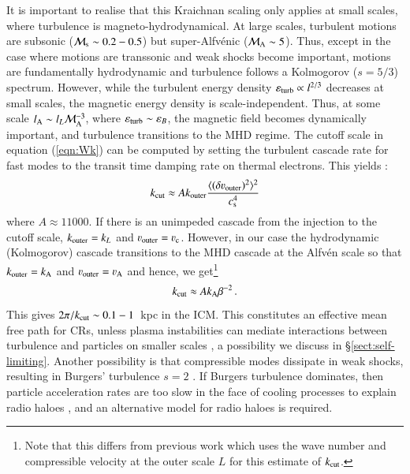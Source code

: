 \documentclass[fleqn,usenatbib,useAMS]{mnras}
\newcommand\cp[1]{{\color{red} #1}}
\newcommand{\eps}{\varepsilon}
\begin{document}
It is important to realise that this Kraichnan scaling only applies at small scales, where turbulence is magneto-hydrodynamical. At large scales, turbulent motions are subsonic (${\mathcal M}_{\rm s} \sim 0.2-0.5$) but super-Alfv{\'e}nic (${\mathcal M}_{\rm A} \sim 5$). Thus, except in the case where motions are transsonic and weak shocks become important, motions are fundamentally hydrodynamic and turbulence follows a Kolmogorov ($s=5/3$) spectrum. However, while the turbulent energy density $\eps_{\rm turb} \propto l^{2/3}$ decreases at small scales, the magnetic energy density is scale-independent. Thus, at some scale $l_{\rm A} \sim l_L {\mathcal M}_{\rm A}^{-3}$, where $\eps_{\rm turb} \sim \eps_{B}$, the magnetic field becomes dynamically important, and turbulence transitions to the MHD regime. The cutoff scale in equation (\ref{eqn:Wk}) can be computed by setting the turbulent cascade rate for fast modes to the transit time damping rate on thermal electrons. This yields \citep{brunetti07,miniati15}:
\begin{equation}
k_{\rm cut} \approx A k_{\rmn{outer}} \frac{\langle (\delta \varv_{\rmn{outer}})^{2}\rangle^{2}}{c_{\rm s}^{4}}
\label{eqn:k_c1} 
\end{equation}
where $A \approx 11 000$. \cp{If there is an unimpeded cascade from the injection to the cutoff scale, $k_{{\mathrm{outer}}}=k_L$ and $\varv_{\rmn{outer}}=\varv_{\rmn{c}}$. However, in our case the hydrodynamic (Kolmogorov) cascade transitions to the MHD cascade at the Alfv{\'e}n scale so that $k_{{\mathrm{outer}}}=k_{{\mathrm{A}}}$ and $\varv_{\rmn{outer}}=\varv_{\rmn{A}}$ and hence, we get\footnote{\cp{Note that this differs from previous work which uses the wave number and compressible velocity at the outer scale $L$ for this estimate of $k_{\rm cut}$.}}
\begin{equation}
k_{\rm cut} \approx A k_{{\mathrm{A}}} \beta^{-2}\,.
\label{eqn:k_c} 
\end{equation}
}
This gives $2\pi/k_{\mathrm{cut}}\sim 0.1-1$~kpc in the ICM. This constitutes an
effective mean free path for CRs, unless plasma instabilities can
mediate interactions between turbulence and particles on smaller
scales \citep{brunetti11}, a possibility we discuss in \S\ref{sect:self-limiting}. Another possibility is that compressible modes dissipate in weak shocks, resulting in Burgers' turbulence $s=2$ \citep{kowal10,porter15,miniati15}. If Burgers turbulence dominates, then particle acceleration rates are too slow in the face of cooling processes to explain radio haloes \citep{miniati15}, and an alternative model for radio haloes is required. 
\end{document}
